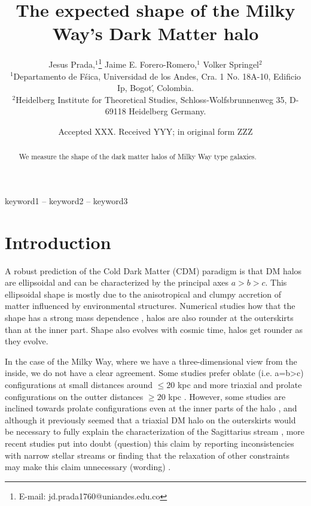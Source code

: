 \documentclass[a4paper,fleqn,usenatbib]{mnras}
\title[Title]{The expected shape of the Milky Way's Dark Matter halo}
\author[Jesus Prada,  Jaime E. Forero-Romero, Volker Springel ]{
Jesus Prada,$^{1}$\thanks{E-mail: jd.prada1760@uniandes.edu.co}
Jaime E. Forero-Romero,$^{1}$
Volker Springel$^{2}$
\\
$^{1}$Departamento de F\'sica, Universidad de los Andes, Cra. 1 No.
18A-10, Edificio Ip, Bogot\', Colombia.\\
$^{2}$Heidelberg Institute for Theoretical Studies, Schloss-Wolfsbrunnenweg 35, D-69118 Heidelberg
Germany.\\
}
\date{Accepted XXX. Received YYY; in original form ZZZ}
\begin{document}
\label{firstpage}
\pagerange{\pageref{firstpage}--\pageref{lastpage}}
\maketitle

\begin{abstract}
We measure the shape of the dark matter halos of Milky Way type galaxies.
\end{abstract}

\begin{keywords}
keyword1 -- keyword2 -- keyword3
\end{keywords}



\section{Introduction}


A robust prediction of the Cold Dark Matter (CDM) paradigm is that DM
halos are ellipsoidal and can be characterized by the principal axes
$a>b>c$.
This ellipsoidal shape is mostly due to the anisotropical and
clumpy accretion of matter influenced by environmental structures. 
Numerical studies how that the shape has a strong mass dependence
\citep{Allgood_et_al._2006}, halos are also rounder at the outerskirts
than at the inner part. Shape also evolves with cosmic time, halos get
rounder as they evolve.  

In the case of the Milky Way, where we have a three-dimensional view
from the inside, we do not have a clear agreement. 
Some studies prefer oblate (i.e. a=b>c) configurations at small
distances around $\leq 20$ kpc \citep[see][]{Law_and_Majewski_2010,Bovy_et_el._2016,Loebman_et_al._2012,Olling_and_Merrifield_2000,Banerjee_and_Chanda_2011}
and more triaxial and prolate configurations on the outter distances
$\geq 20$ kpc 
\citep[see][]{Vera-Ciro_and_Helmi_2013,Law_and_Majewski_2009,Deg_and_Widrow_2013,Banerjee_and_Chanda_2011}.
However,
some 
studies are inclined towards prolate configurations even at the inner
parts of the halo \citep[see][]{Bowden_et_al._2016}, and
although it previously seemed that a triaxial DM halo on the
outerskirts would be necessary to fully explain the characterization
of the Sagittarius stream \citep[see][]{LMJ09}, more recent studies
put into doubt (question) this claim by reporting inconsistencies with
narrow stellar streams \citet{PearsonKupperJohtnston, MoreLikeThis} or
finding that the relaxation of other constraints may make this claim
unnecessary (wording) \citet{IbataLewisMartin}.




\end{document}
